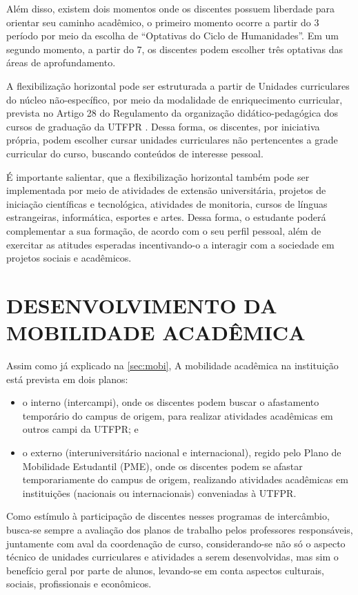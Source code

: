 Além disso, existem dois momentos onde os discentes possuem liberdade para orientar seu caminho acadêmico, o primeiro momento ocorre a partir do 3\textordmasculine{} período por meio da escolha de ``Optativas do Ciclo de Humanidades''. Em um segundo momento, a partir do 7\textordmasculine{}, os discentes podem escolher três optativas das áreas de aprofundamento.

A flexibilização horizontal pode ser estruturada a partir de Unidades curriculares do núcleo não-específico, por meio da modalidade de enriquecimento curricular, prevista no Artigo 28 do Regulamento da organização didático-pedagógica dos cursos de graduação da UTFPR \cite{rodp}. Dessa forma, os discentes, por iniciativa própria, podem escolher cursar unidades curriculares não pertencentes a grade curricular do curso, buscando conteúdos de interesse pessoal.

É importante salientar, que a flexibilização horizontal também pode ser implementada por meio de atividades de extensão universitária, projetos de iniciação científicas e tecnológica, atividades de monitoria, cursos de línguas estrangeiras, informática, esportes e artes. Dessa forma, o estudante poderá complementar a sua formação, de acordo com o seu perfil pessoal, além de exercitar as atitudes esperadas incentivando-o a interagir com a sociedade em projetos sociais e acadêmicos.

\section{DESENVOLVIMENTO DA MOBILIDADE ACADÊMICA}

Assim como já explicado na \autoref{sec:mobi}, A mobilidade acadêmica na instituição está prevista em dois planos: 

\begin{itemize}
    \item o interno (intercampi), onde os discentes podem buscar o afastamento temporário do campus de origem, para realizar atividades acadêmicas em outros campi da UTFPR; e
    \item o externo (interuniversitário nacional e internacional), regido pelo Plano de Mobilidade Estudantil (PME), onde os discentes podem se afastar temporariamente do campus de origem, realizando atividades acadêmicas em instituições (nacionais ou internacionais) conveniadas à UTFPR.
\end{itemize}
 
Como estímulo à participação de discentes nesses programas de intercâmbio, busca-se sempre a avaliação dos planos de trabalho pelos professores responsáveis, juntamente com aval da coordenação de curso, considerando-se não só o aspecto técnico de unidades curriculares e atividades a serem desenvolvidas, mas sim o benefício geral por parte de alunos, levando-se em conta aspectos culturais, sociais, profissionais e econômicos.

